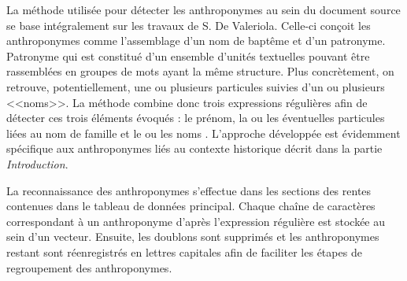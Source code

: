 La méthode utilisée pour détecter les anthroponymes au sein du document source se base intégralement sur les travaux de S. De Valeriola. Celle-ci conçoit les anthroponymes comme l'assemblage d'un nom de baptême et d'un patronyme. Patronyme qui est constitué d'un ensemble d'unités textuelles  pouvant être rassemblées en  groupes de mots ayant la même structure. Plus concrètement, on retrouve, potentiellement,  une ou plusieurs particules  suivies d'un ou plusieurs <<noms>>. La méthode combine donc trois expressions régulières afin de détecter ces trois éléments évoqués : le prénom, la ou les éventuelles particules liées au nom de famille et le ou les noms \parencite{de_valeriola_lordinateur_2021}. L'approche développée est évidemment spécifique aux anthroponymes liés au contexte historique décrit dans la partie \textit{Introduction}.

La reconnaissance des anthroponymes s'effectue dans les sections des rentes contenues dans le tableau de données principal. Chaque chaîne de caractères correspondant à un anthroponyme d'après l'expression régulière est stockée au sein d'un vecteur. Ensuite, les doublons sont supprimés et les anthroponymes restant sont réenregistrés en lettres capitales afin de faciliter les étapes de regroupement des anthroponymes.

